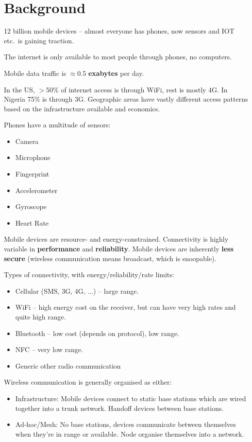 \documentclass[a4paper, 11pt]{article}
\begin{document}
\section*{Background}
{
    12 billion mobile devices -- almost everyone has phones, now sensors and IOT etc.\ is gaining traction.

    The internet is only available to most people through phones, no computers.

    Mobile data traffic is \(\approx\)0.5 \textbf{exabytes} per day.

    In the US, \(>\)50\% of internet access is through WiFi, rest is mostly 4G. In Nigeria 75\% is through 3G. Geographic areas have vastly different access patterns based on the infrastructure available and economics.

    Phones have a multitude of sensors:
    \begin{itemize}
    \item Camera
    \item Microphone
    \item Fingerprint
    \item Accelerometer
    \item Gyroscope
    \item Heart Rate
    \end{itemize}

    Mobile devices are resource- and energy-constrained. Connectivity is highly variable in \textbf{performance} and \textbf{reliability}. Mobile devices are inherently \textbf{less secure} (wireless communication means broadcast, which is snoopable).

    Types of connectivity, with energy/reliability/rate limits:
    \begin{itemize}
    \item Cellular (SMS, 3G, 4G, ...) -- large range.
    \item WiFi -- high energy cost on the receiver, but can have very high rates and quite high range.
    \item Bluetooth -- low cost (depends on protocol), low range.
    \item NFC -- very low range.
    \item Generic other radio communication
    \end{itemize}

    Wireless communication is generally organised as either:
    \begin{itemize}
    \item Infrastructure: Mobile devices connect to static base stations which are wired together into a trunk network. Handoff devices between base stations.
    \item Ad-hoc/Mesh: No base stations, devices communicate between themselves when they're in range or available. Node organise themselves into a network.
    \end{itemize}

}
\end{document}
